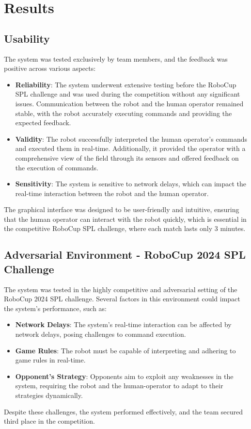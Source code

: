 \documentclass[a4paper, onecolumn, 12pt]{article}
\begin{document}
\section{Results}
\label{sec:res}
\subsection{Usability}  
The system was tested exclusively by team members, and the feedback was positive 
across various aspects:  
\begin{itemize}  
    \item \textbf{Reliability}: The system underwent extensive testing before the RoboCup 
    SPL challenge and was used during the competition without any significant issues. 
    Communication between the robot and the human operator remained stable, with the 
    robot accurately executing commands and providing the expected feedback.  
    \item \textbf{Validity}: The robot successfully interpreted the human operator's 
    commands and executed them in real-time. Additionally, it provided the operator with a comprehensive view of the field through its sensors and offered feedback on the execution of commands.  
    \item \textbf{Sensitivity}: The system is sensitive to network delays, which can 
    impact the real-time interaction between the robot and the human operator.  
\end{itemize}  

The graphical interface was designed to be user-friendly and intuitive, ensuring that 
the human operator can interact with the robot quickly, which is essential in the 
competitive RoboCup SPL challenge, where each match lasts only 3 minutes.  

\subsection{Adversarial Environment - RoboCup 2024 SPL Challenge}  
The system was tested in the highly competitive and adversarial setting of the RoboCup 
2024 SPL challenge. Several factors in this environment could impact the system’s 
performance, such as:  
\begin{itemize}  
    \item \textbf{Network Delays}: The system’s real-time interaction can be affected 
    by network delays, posing challenges to command execution.  
    \item \textbf{Game Rules}: The robot must be capable of interpreting and adhering 
    to game rules in real-time.  
    \item \textbf{Opponent's Strategy}: Opponents aim to exploit any weaknesses in the 
    system, requiring the robot and the human-operator to adapt to their strategies dynamically.  
\end{itemize}  
Despite these challenges, the system performed effectively, and the team secured third 
place in the competition.  
\end{document}
